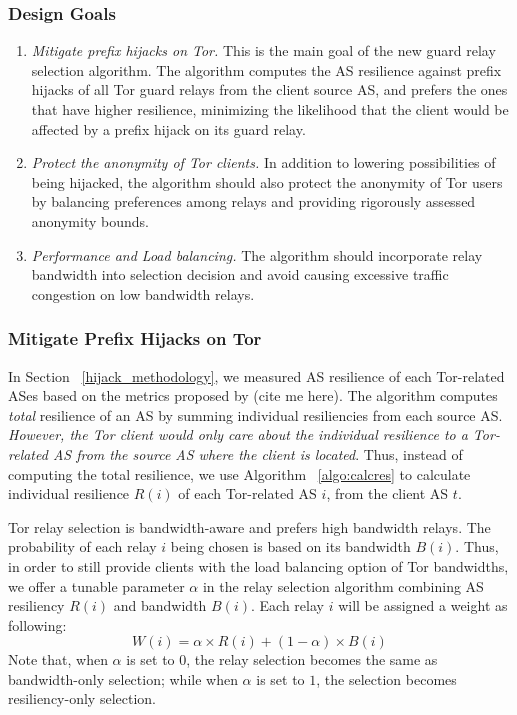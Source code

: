 \subsubsection{Design Goals}
\begin{enumerate}
\item \emph{Mitigate prefix hijacks on Tor.} This is the main goal of the new guard relay selection algorithm. The algorithm computes the AS resilience against prefix hijacks of all Tor guard relays from the client source AS, and prefers the ones that have higher resilience, minimizing the likelihood that the client would be affected by a prefix hijack on its guard relay. 
\item \emph{Protect the anonymity of Tor clients.} In addition to lowering possibilities of being hijacked, the algorithm should also protect the anonymity of Tor users by balancing preferences among relays and providing rigorously assessed anonymity bounds. 
\item \emph{Performance and Load balancing.} The algorithm should incorporate relay bandwidth into selection decision and avoid causing excessive traffic congestion on low bandwidth relays.
\end{enumerate}

\subsubsection{Mitigate Prefix Hijacks on Tor}

In Section ~\ref{hijack_methodology}, we measured AS resilience of each Tor-related ASes based on the metrics proposed by (cite me here). The algorithm computes \emph{total} resilience of an AS by summing individual resiliencies from each source AS. \emph{However, the Tor client would only care about the individual resilience to a Tor-related AS from the source AS where the client is located}. Thus, instead of computing the total resilience, we use Algorithm ~\ref{algo:calcres} to calculate individual resilience $R(i)$ of each Tor-related AS $i$, from the client AS $t$. 

Tor relay selection is bandwidth-aware and prefers high bandwidth relays. The probability of each relay $i$ being chosen is based on its bandwidth $B(i)$. Thus, in order to still provide clients with the load balancing option of Tor bandwidths, we offer a tunable parameter $\alpha$ in the relay selection algorithm combining AS resiliency $R(i)$ and bandwidth $B(i)$. Each relay $i$ will be assigned a weight as following:
\begin{equation*}
W(i) = \alpha \times R(i) + (1 - \alpha) \times B(i)
\end{equation*}
Note that, when $\alpha$ is set to $0$, the relay selection becomes the same as bandwidth-only selection; while when $\alpha$ is set to $1$, the selection becomes resiliency-only selection. 

